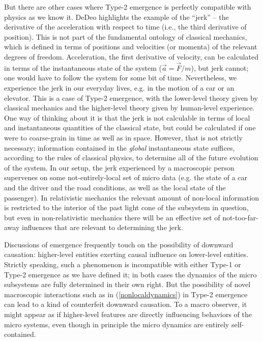 \documentclass[12pt,english]{article}
\newcommand{\autocite}{\cite}
\begin{document}
But there are other cases where Type-2 emergence is perfectly compatible with physics as we know it.
DeDeo \autocite{DeDeo_2018} highlights the example of the ``jerk'' -- the derivative of the acceleration with respect to time (i.e., the third derivative of position).
This is not part of the fundamental ontology of classical mechanics, which is defined in terms of positions and velocities (or momenta) of the relevant degrees of freedom.
Acceleration, the first derivative of velocity, can be calculated in terms of the instantaneous state of the system ($\vec a = \vec{F}/m$), but jerk cannot; one would have to follow the system for some bit of time.
Nevertheless, we experience the jerk in our everyday lives, e.g. in the motion of a car or an elevator.
This is a case of Type-2 emergence, with the lower-level theory given by classical mechanics and the higher-level theory given by human-level experience.
One way of thinking about it is that the jerk is not calculable in terms of local and instantaneous quantities of the classical state, but could be calculated if one were to coarse-grain in time as well as in space.
However, that is not strictly necessary; information contained in the \emph{global} instantaneous state suffices, according to the rules of classical physics, to determine all of the future evolution of the system.
In our setup, the jerk experienced by a macroscopic person supervenes on some not-entirely-local set of micro data (e.g. the state of a car and the driver and the road conditions, as well as the local state of the passenger).
In relativistic mechanics the relevant amount of non-local information is restricted to the interior of the past light cone of the subsystem in question, but even in non-relativistic mechanics there will be an effective set of not-too-far-away influences that are relevant to determining the jerk.

Discussions of emergence frequently touch on the possibility of downward causation: higher-level entities exerting causal influence on lower-level entities. 
Strictly speaking, such a phenomenon is incompatible with either Type-1 or Type-2 emergence as we have defined it; in both cases the dynamics of the micro subsystems are fully determined in their own right. 
But the possibility of novel macroscopic interactions such as in (\ref{nonlocaldynamics}) in Type-2 emergence can lead to a kind of counterfeit downward causation.
To a macro observer, it might appear as if higher-level features are directly influencing behaviors of the micro systems, even though in principle the micro dynamics are entirely self-contained.
\end{document}
